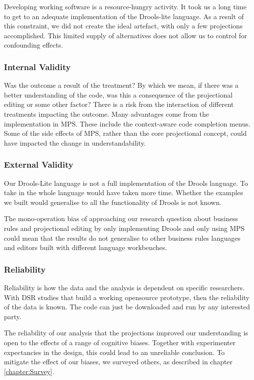 Developing working software is a resource-hungry activity. 
It took us a long time to get to an adequate implementation of the Drools-lite language.
As a result of this constraint, we did not create the ideal artefact, with only a few projections accomplished.
This limited supply of alternatives does not allow us to control for confounding effects.

\subsubsection{Internal Validity}
Was the outcome a result of the treatment?
By which we mean, if there was a better understanding of the code, was this a consequence of the projectional editing or some other factor?
There is a risk from the interaction of different treatments impacting the outcome.
Many advantages come from the implementation in MPS.
These include the context-aware code completion menus.
Some of the side effects of MPS, rather than the core projectional concept, could have impacted the change in understandability.

\subsubsection{External Validity}
Our Drools-Lite language is not a full implementation of the Drools language.
To take in the whole language would have taken more time.
Whether the examples we built would generalise to all the functionality of Drools is not known.

The mono-operation bias of approaching our research question about business rules and projectional editing by only implementing Drools and only using MPS could mean that the results do not generalise to other business rules languages and editors built with different language workbenches. 

\subsubsection{Reliability}
Reliability is how the data and the analysis is dependent on specific researchers.
With DSR studies that build a working opensource prototype, then the reliability of the data is known.
The code can just be downloaded and run by any interested party.  

The reliability of our analysis that the projections improved our understanding is open to the effects of a range of cognitive biases. 
Together with experimenter expectancies in the design, this could lead to an unreliable conclusion. 
To mitigate the effect of our biases, we surveyed others, as described in chapter \ref{chapter:Survey}.
